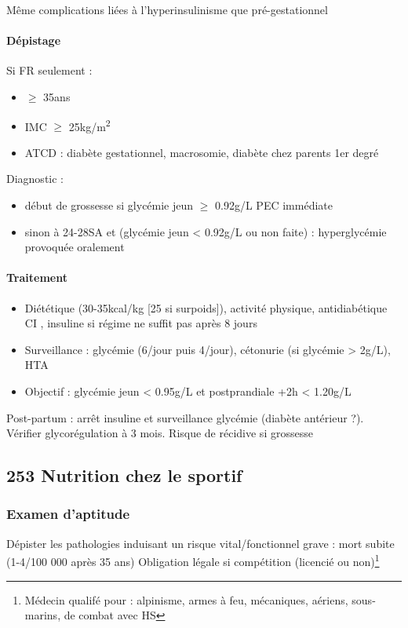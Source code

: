 \documentclass[11pt]{article}
\begin{document}
Même complications liées à l'hyperinsulinisme que pré-gestationnel

\paragraph{Dépistage}
\label{sec:org504134b}
Si FR seulement : 
\begin{itemize}
\item \(\ge\) 35ans
\item IMC \(\ge\) 25kg/m\textsuperscript{2}
\item ATCD : diabète gestationnel, macrosomie, diabète chez parents 1er degré
\end{itemize}
Diagnostic :
\begin{itemize}
\item début de grossesse si glycémie jeun \(\ge\) 0.92g/L \thus PEC immédiate
\item sinon à 24-28SA et (glycémie jeun < 0.92g/L ou non faite) : hyperglycémie
provoquée oralement
\end{itemize}

\paragraph{Traitement}
\label{sec:orgab55548}
\begin{itemize}
\item Diététique (30-35kcal/kg [25 si surpoids]), activité physique, antidiabétique
CI , insuline si régime ne suffit pas après 8 jours
\item Surveillance : glycémie (6/jour puis 4/jour), cétonurie (si glycémie > 2g/L),
HTA
\item Objectif : glycémie jeun < 0.95g/L et postprandiale +2h < 1.20g/L
\end{itemize}

Post-partum : arrêt insuline et surveillance glycémie (diabète antérieur
?). Vérifier glycorégulation à 3 mois. Risque de récidive si grossesse
\subsection{253 \textdagger{} Nutrition chez le sportif}
\label{sec:org644dd65}
\subsubsection{Examen d'aptitude}
\label{sec:org5f2eafd}
Dépister les pathologies induisant un risque vital/fonctionnel grave : mort
subite (1-4/100 000 après 35 ans)
Obligation légale si compétition (licencié ou non)\footnote{Médecin qualifé pour : alpinisme, armes à feu, mécaniques, aériens, sous-marins, de combat
avec HS}
\end{document}
